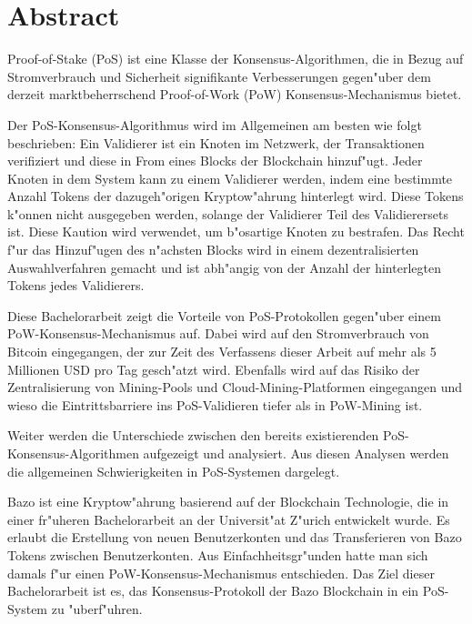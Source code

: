 \chapter*{Abstract}


Proof-of-Stake (PoS) ist eine Klasse der Konsensus-Algorithmen, die in Bezug auf Stromverbrauch und Sicherheit signifikante Verbesserungen gegen"uber dem derzeit marktbeherrschend Proof-of-Work (PoW) Konsensus-Mechanismus bietet.


Der PoS-Konsensus-Algorithmus wird im Allgemeinen am besten wie folgt beschrieben: Ein Validierer ist ein Knoten im Netzwerk, der Transaktionen verifiziert und diese in From eines Blocks der Blockchain hinzuf"ugt. Jeder Knoten in dem System kann zu einem Validierer werden, indem eine bestimmte Anzahl Tokens der dazugeh"origen Kryptow"ahrung hinterlegt wird. Diese Tokens k"onnen nicht ausgegeben werden, solange der Validierer Teil des Validierersets ist. Diese Kaution wird verwendet, um b"osartige Knoten zu bestrafen. Das Recht f"ur das Hinzuf"ugen des n"achsten Blocks wird in einem dezentralisierten Auswahlverfahren gemacht und ist abh"angig von der Anzahl der hinterlegten Tokens jedes Validierers.


Diese Bachelorarbeit zeigt die Vorteile von PoS-Protokollen gegen"uber einem PoW-Konsensus-Mechanismus auf. Dabei wird auf den Stromverbrauch von Bitcoin eingegangen, der zur Zeit des Verfassens dieser Arbeit auf mehr als 5 Millionen USD pro Tag gesch"atzt wird. Ebenfalls wird auf das Risiko der Zentralisierung von Mining-Pools und Cloud-Mining-Platformen eingegangen und wieso die Eintrittsbarriere ins PoS-Validieren tiefer als in PoW-Mining ist. 

Weiter werden die Unterschiede zwischen den bereits existierenden PoS-Konsensus-Algorithmen aufgezeigt und analysiert. Aus diesen Analysen werden die allgemeinen Schwierigkeiten in PoS-Systemen dargelegt.

Bazo ist eine Kryptow"ahrung basierend auf der Blockchain Technologie, die in einer fr"uheren Bachelorarbeit an der Universit"at Z"urich entwickelt wurde. Es erlaubt die Erstellung von neuen Benutzerkonten und das Transferieren von Bazo Tokens zwischen Benutzerkonten. Aus Einfachheitsgr"unden hatte man sich damals f"ur einen PoW-Konsensus-Mechanismus entschieden. Das Ziel dieser Bachelorarbeit ist es, das Konsensus-Protokoll der Bazo Blockchain in ein PoS-System zu "uberf"uhren.


